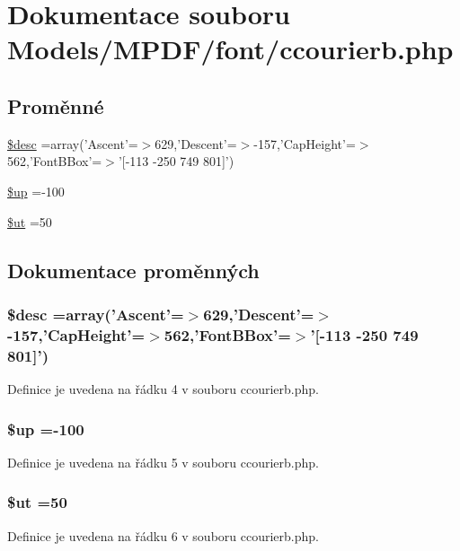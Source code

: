 \hypertarget{ccourierb_8php}{\section{Dokumentace souboru Models/\-M\-P\-D\-F/font/ccourierb.php}
\label{ccourierb_8php}
}
\subsection*{Proměnné}
\begin{DoxyCompactItemize}
\item 
\hyperlink{ccourierb_8php_a31059b9e4d0c5af34df20da32232ea9a}{\$desc} =array('Ascent'=$>$629,'Descent'=$>$-\/157,'Cap\-Height'=$>$562,'Font\-B\-Box'=$>$'\mbox{[}-\/113 -\/250 749 801\mbox{]}')
\item 
\hyperlink{ccourierb_8php_a6b5ad2ac55f9df46e8f34e78fbd6f176}{\$up} =-\/100
\item 
\hyperlink{ccourierb_8php_aadd3f841051043ee58e587e840e8dd0b}{\$ut} =50
\end{DoxyCompactItemize}


\subsection{Dokumentace proměnných}
\hypertarget{ccourierb_8php_a31059b9e4d0c5af34df20da32232ea9a}{
\subsubsection[{\$desc}]{\setlength{\rightskip}{0pt plus 5cm}\$desc =array('Ascent'=$>$629,'Descent'=$>$-\/157,'Cap\-Height'=$>$562,'Font\-B\-Box'=$>$'\mbox{[}-\/113 -\/250 749 801\mbox{]}')}}\label{ccourierb_8php_a31059b9e4d0c5af34df20da32232ea9a}


Definice je uvedena na řádku 4 v souboru ccourierb.\-php.

\hypertarget{ccourierb_8php_a6b5ad2ac55f9df46e8f34e78fbd6f176}{
\subsubsection[{\$up}]{\setlength{\rightskip}{0pt plus 5cm}\$up =-\/100}}\label{ccourierb_8php_a6b5ad2ac55f9df46e8f34e78fbd6f176}


Definice je uvedena na řádku 5 v souboru ccourierb.\-php.

\hypertarget{ccourierb_8php_aadd3f841051043ee58e587e840e8dd0b}{
\subsubsection[{\$ut}]{\setlength{\rightskip}{0pt plus 5cm}\$ut =50}}\label{ccourierb_8php_aadd3f841051043ee58e587e840e8dd0b}


Definice je uvedena na řádku 6 v souboru ccourierb.\-php.

